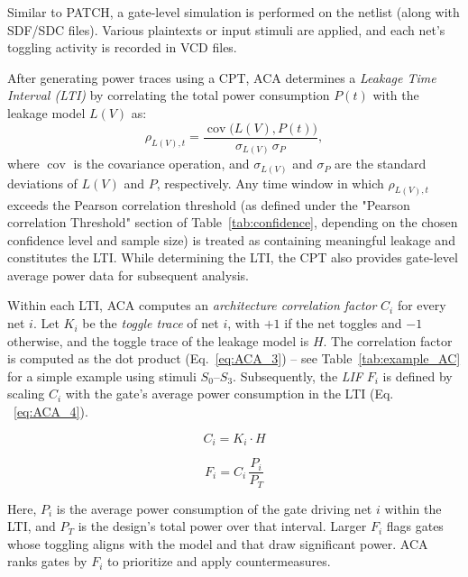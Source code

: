 \documentclass[sigconf]{acmart}
\begin{document}
 Similar to PATCH, a gate-level simulation is performed on the netlist (along with SDF/SDC files). Various plaintexts or input stimuli are applied, and each net's toggling activity is recorded in VCD files.

After generating power traces using a CPT, ACA determines a \emph{Leakage Time Interval (LTI)} by correlating the total power consumption \(P(t)\) with the leakage model \(L(V)\) as:
\begin{equation}
\rho_{L(V),t}=\frac{\operatorname{cov}\!\big(L(V),P(t)\big)}{\sigma_{L(V)}\,\sigma_{P}},
  \label{eq:ACA_1}
\end{equation}
\noindent%
where \(\operatorname{cov}\) is the covariance operation, and \(\sigma_{L(V)}\) and \(\sigma_{P}\) are the standard deviations of \(L(V)\) and \(P\), respectively.
Any time window in which \(\rho_{L(V),t}\) exceeds the Pearson correlation threshold (as defined under the "Pearson correlation Threshold" section of Table~\ref{tab:confidence}, depending on the chosen confidence level and sample size) is treated as containing meaningful leakage and constitutes the LTI. While determining the LTI, the CPT also provides gate-level average power data for subsequent analysis.

 \label{sec:ACA_leak}
Within each LTI, ACA computes an \emph{architecture correlation factor} \(C_i\) for every net \(i\). Let \(K_i\) be the \emph{toggle trace} of net \(i\), with \(+1\) if the net toggles and \(-1\) otherwise, and the toggle trace of the leakage model is \(H\). The correlation factor is computed as the dot product (Eq.~\ref{eq:ACA_3}) -- see Table~\ref{tab:example_AC} for a simple example using stimuli \(S_0\)–\(S_3\). Subsequently, the \emph{LIF} \(F_i\) is defined by scaling \(C_i\) with the gate’s average power consumption in the LTI (Eq. ~\ref{eq:ACA_4}).

\noindent
\begin{minipage}{0.48\linewidth}
\begin{equation}
  C_i = K_i \cdot H
  \label{eq:ACA_3}
\end{equation}
\end{minipage}\hfill
\begin{minipage}{0.48\linewidth}
\begin{equation}
  F_i = C_i\,\frac{P_i}{P_T}
  \label{eq:ACA_4}
\end{equation}
\end{minipage}
\noindent
Here, \(P_i\) is the average power consumption of the gate driving net \(i\) within the LTI, and \(P_T\) is the design’s total power over that interval. Larger \(F_i\) flags gates whose toggling aligns with the model and that draw significant power. ACA ranks gates by \(F_i\) to prioritize and apply countermeasures.
\end{document}
